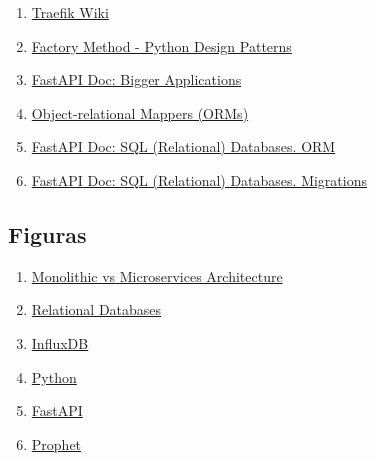 \documentclass[a4paper, oneside, 12pt]{book}
\begin{document}
\begin{enumerate}
		\item
		\label{bib: traefik wiki}
		\href{https://doc.traefik.io/traefik/}{Traefik Wiki}
		
		\item
		\label{bib: factory method}
		\href{https://www.geeksforgeeks.org/factory-method-python-design-patterns/}{Factory Method - Python Design Patterns}
		
		\item
		\label{bib: fastapi doc bigger apps}
		\href{https://fastapi.tiangolo.com/tutorial/bigger-applications/}{FastAPI Doc: Bigger Applications}
		
		\item
		\label{bib: orm python}
		\href{https://www.fullstackpython.com/object-relational-mappers-orms.html}{Object-relational Mappers (ORMs)}
		
		\item
		\label{bib: fastapi orm}
		\href{https://fastapi.tiangolo.com/tutorial/sql-databases/#orms}{FastAPI Doc: SQL (Relational) Databases. ORM}
		
		\item
		\label{bib: fastapi migrations}
		\href{https://fastapi.tiangolo.com/tutorial/sql-databases/#migrations}{FastAPI Doc: SQL (Relational) Databases. Migrations}
		
		
	\end{enumerate}

	\vspace{20px}
	
	\subsection*{Figuras}

	\begin{enumerate}
		
		\item
		\label{bib_img: microservice architecture}
		\href{https://xbsoftware.com/blog/microservices-vs-monolithic-architecture/}{Monolithic vs Microservices Architecture}
		
		\item
		\label{bib_img: example sql}
		\href{https://xbsoftware.com/blog/main-types-of-database-management-systems/}{Relational Databases}
		
		\item
		\label{bib_img: influxdb logo}
		\href{https://www.influxdata.com/}{InfluxDB}
		
		\item
		\label{bib_img: python logo}
		\href{https://www.python.org/}{Python}
		
		\item
		\label{bib_img: fastapi logo}
		\href{https://fastapi.tiangolo.com/}{FastAPI}
		
		\item
		\label{bib_img: prophet logo}
		\href{https://facebook.github.io/prophet/}{Prophet}
		
		
	\end{enumerate}
	
\end{document}
